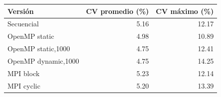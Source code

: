 \begin{tabular}{lrr}
\toprule
Versi\'on & CV promedio (\%) & CV m\'aximo (\%) \\
\midrule
Secuencial & 5.16 & 12.17 \\
OpenMP static & 4.98 & 10.89 \\
OpenMP static,1000 & 4.75 & 12.41 \\
OpenMP dynamic,1000 & 4.75 & 14.25 \\
MPI block & 5.23 & 12.14 \\
MPI cyclic & 5.20 & 13.39 \\
\bottomrule
\end{tabular}